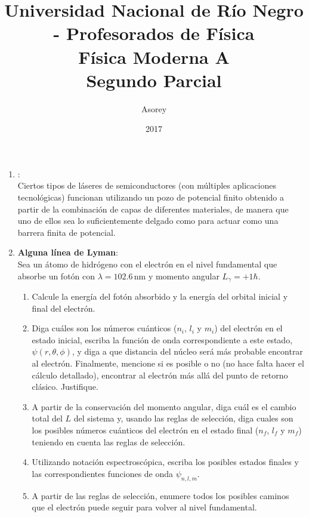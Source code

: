 \documentclass[a4paper,12pt]{article}
\begin{document}
\title{
{\normalsize{Universidad Nacional de Río Negro - Profesorados de Física}}\\
Física Moderna A \\ Segundo Parcial\\}
\author{Asorey}
\date{2017}
\maketitle

\begin{enumerate}
	\item {\bf{ }}:\\
		Ciertos tipos de láseres de semiconductores (con múltiples aplicaciones
		tecnológicas) funcionan utilizando un pozo de potencial finito obtenido
		a partir de la combinación de capas de diferentes materiales, de manera
		que uno de ellos sea lo suficientemente delgado como para actuar como
		una barrera finita de potencial.  
	
	
	
	\item {\bf{Alguna línea de Lyman}}:\\
		Sea un átomo de hidrógeno con el electrón en el
		nivel fundamental que absorbe un fotón con $\lambda=102.6$\,nm y momento
		angular $L_\gamma = + 1 \hbar$.
		\begin{enumerate}
			\item Calcule la energía del fotón absorbido y la energía del
				orbital inicial y final del electrón.
			\item Diga cuáles son los números cuánticos ($n_i$, $l_i$ y $m_i$)
				del electrón en el estado inicial, escriba la función de onda
				correspondiente a este estado, $\psi(r,\theta,\phi)$, y diga a
				que distancia del núcleo será más probable encontrar al
				electrón. Finalmente, mencione si es posible o no (no hace
				falta hacer el cálculo detallado), encontrar al electrón más
				allá del punto de retorno clásico. Justifique.
			\item A partir de la conservación del momento angular, diga cuál es
				el cambio total del $L$ del sistema y, usando las reglas de
				selección, diga cuales son los posibles números cuánticos del
				electrón en el estado final ($n_f$, $l_f$ y $m_f$) teniendo en
				cuenta las reglas de selección.
			\item Utilizando notación espectroscópica, escriba los posibles
				estados finales y las correspondientes funciones de onda
				$\psi_{n,l,m}$.
			\item A partir de las reglas de selección, enumere todos los
				posibles caminos que el electrón puede seguir para volver al
				nivel fundamental.
		\end{enumerate}
\end{enumerate}
\end{document}
